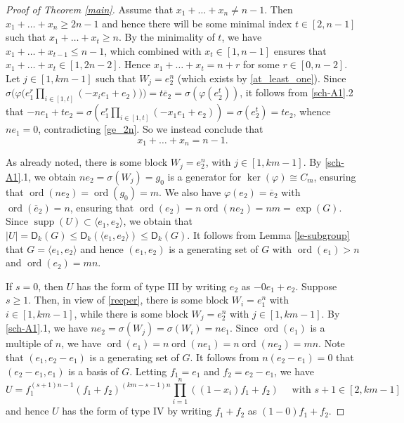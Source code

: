 \documentclass[11pt]{amsart}
\theoremstyle{definition}
\DeclareMathOperator{\ord}{ord}
\DeclareMathOperator{\supp}{supp}
\newcommand{\la}{\langle}
\newcommand{\ra}{\rangle}
\newcommand{\be}{\begin{equation}}
\newcommand{\ee}{\end{equation}}
\newcommand{\nn}{\nonumber}
\numberwithin{equation}{section}
\begin{document}
\begin{proof}[Proof of Theorem \ref{main}]
	 Assume that $x_1+\ldots+x_n\neq n-1$. Then $x_1+\ldots+x_n\ge  2n-1$ and hence 
	 there will be some minimal index $t\in [2,n-1]$ such that $x_1+\ldots+x_t\geq n$. By the minimality of $t$, we have $x_1+\ldots+x_{t-1}\leq n-1$, which combined with $x_t\in [1,n-1]$ ensures that $x_1+\ldots+x_{t}\in [1,2n-2]$. Hence $x_1+\ldots+x_t=n+r$ for some $r\in [0,n-2]$. Let  $j\in [1,km-1]$ such that $W_j=e_2^n$ (which exists by \eqref{at_least_one}). Since $\sigma\big(\varphi\big(e_1^r \prod_{i\in [1,t]}(-x_ie_1+e_2)\big)\big)=t\overline e_2=\sigma(\varphi(e_2^t))$, it follows from \ref{sch-A1}.2 that $-ne_1+te_2=\sigma(e_1^r \prod_{i\in [1,t]}(-x_1e_1+e_2))=\sigma(e_2^t)=te_2$, whence $ne_1=0$, contradicting  \eqref{ge_2n}. So we instead conclude that
	\be\nn x_1+\ldots+x_n=n-1.\ee
	
	As already noted, there is some block $W_j=e_2^n$, with $j\in [1,km-1]$. By \ref{sch-A1}.1, we obtain $ne_2=\sigma(W_j)=g_0$ is a generator for $\ker(\varphi)\cong C_m$, ensuring that $\ord(ne_2)=\ord(g_0)=m$. We also have $\varphi(e_2)=\overline e_2$ with $\ord(\overline e_2)=n$, ensuring that $\ord(e_2)=n\ord(ne_2)=nm=\exp(G)$. 
	Since $\supp(U)\subset \la e_1,e_2\ra$, we obtain that 
	$|U|=\mathsf D_k(G)\le \mathsf D_k(\la e_1,e_2\ra)\le \mathsf D_k(G)$. It follows from Lemma \ref{le-subgroup} that $G=\langle e_1,e_2\rangle$ and hence $(e_1,e_2)$ is a generating set of $G$ with $\ord(e_1)>n$ and $\ord(e_2)=mn$. 
	
	
	
	
	If $s=0$, then  $U$ has the form of type III by writing $e_2$ as $-0e_1+e_2$.
	Suppose $s\geq 1$. Then, in view of \eqref{reeper}, there is some block $W_i=e_1^n$ with $i\in [1,km-1]$, while there is some block $W_j=e_2^n$ with $j\in [1,km-1]$. By \ref{sch-A1}.1, we have $ne_2=\sigma(W_j)=\sigma(W_i)=ne_1$. 
	Since $\ord(e_1)$ is a multiple of $n$, we have $\ord(e_1)=n\ord(ne_1)=n\ord(ne_2)=mn$. Note that $(e_1, e_2-e_1)$ is a generating set of $G$. It follows from $n(e_2-e_1)=0$ that $(e_2-e_1, e_1)$ is a basis of $G$. Letting $f_1=e_1$ and $f_2=e_2-e_1$, we have 
	\[
	U=f_1^{(s+1)n-1}(f_1+f_2)^{(km-s-1)n}\prod_{i=1}^n((1-x_i)f_1+f_2)\quad \text{ with }s+1\in [2, km-1]
	\]
	and hence   $U$ has the form of type IV by writing $f_1+f_2$ as $(1-0)f_1+f_2$.
\end{proof}
\end{document}
